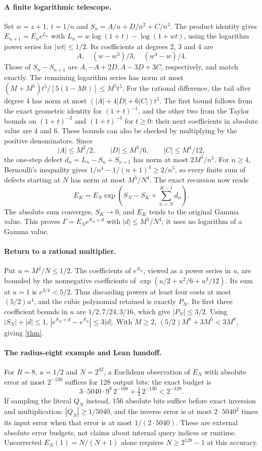 \documentclass[11pt]{article}
\begin{document}
\paragraph{A finite logarithmic telescope.}
Set \(w=z+1,\ t=1/n\) and \(S_n=A/n+D/n^2+C/n^3\).
The product identity gives \(E_{n+1}=E_n e^{L_n}\) with
\(L_n=w\log(1+t)-\log(1+wt)\), using the logarithm power series
for \(|wt|\le1/2\). Its coefficients at degrees 2, 3 and 4 are
\[
 A,\quad (w-w^3)/3,\quad (w^4-w)/4.
\]
Those of \(S_n-S_{n+1}\) are \(A,-A+2D,A-3D+3C\), respectively,
and match exactly. The remaining logarithm series has norm at most
\((M+M^5)t^5/[5(1-Mt)]\le M^5t^5\).
\newpage
For the rational difference, the tail after degree 4 has norm
at most \((|A|+4|D|+6|C|)t^5\). The first bound follows from
the exact geometric identity for \((1+t)^{-1}\), and the other
two from the Taylor bounds on \((1+t)^{-2}\) and \((1+t)^{-3}\)
for \(t\ge0\): their next coefficients in absolute value are 4 and 6.
These bounds can also be checked by multiplying by the positive
denominators. Since
\[
 |A|\le M^2/2,\qquad |D|\le M^3/6,\qquad |C|\le M^4/12,
\]
the one-step defect \(d_n=L_n-S_n+S_{n+1}\) has norm at most
\(2M^5/n^5\).
For \(n\ge4\), Bernoulli's inequality gives
\(1/n^4-1/(n+1)^4\ge2/n^5\), so every finite sum of defects
starting at \(N\) has norm at most \(M^5/N^4\).
The exact recursion now reads
\[
 E_K=E_N\exp\left(S_N-S_K+\sum_{n=N}^{K-1}d_n\right).
\]
The absolute sum converges, \(S_K\to0\), and \(E_K\) tends to
the original Gamma value. This proves \(\Gamma=E_N e^{S_N+d}\)
with \(|d|\le M^5/N^4\); it uses no logarithm of a Gamma value.

\paragraph{Return to a rational multiplier.}
Put \(u=M^2/N\le1/2\). The coefficients of \(e^{S_N}\), viewed as
a power series in \(u\), are bounded by the nonnegative coefficients
of \(\exp(u/2+u^2/6+u^3/12)\).
Its sum at \(u=1\) is \(e^{3/4}<5/2\).
Thus discarding powers at least four costs at most
\((5/2)u^4\), and the cubic polynomial retained is exactly \(P_N\).
Its first three coefficient bounds in \(u\) are \(1/2,7/24,3/16\),
which give \(|P_N|\le3/2\).
Using \(|S_N|+|d|\le1\),
\(|e^{S_N+d}-e^{S_N}|\le3|d|\). With \(M\ge2\),
\((5/2)M^8+3M^5<3M^8\), giving \eqref{thm}.

\paragraph{The radius-eight example and Lean handoff.}
For \(R=8,\ a=1/2\) and \(N=2^{42}\), a Euclidean observation
of \(E_N\) with absolute error at most \(2^{-130}\) suffices for
128 output bits: the exact budget is
\[
 3\cdot5040\cdot9^8\,2^{-168}+\tfrac32\,2^{-130}<2^{-128}.
\]
If sampling the literal \(Q_N\) instead, 156 absolute bits suffice
before exact inversion and multiplication: \(|Q_N|\ge1/5040\),
and the inverse error is at most \(2\cdot5040^2\) times its input
error when that error is at most \(1/(2\cdot5040)\).
These are external absolute error budgets, not claims about internal
query indices or runtime. Uncorrected \(E_N(1)=N/(N+1)\) alone
requires \(N\ge2^{128}-1\) at this accuracy.
\end{document}
